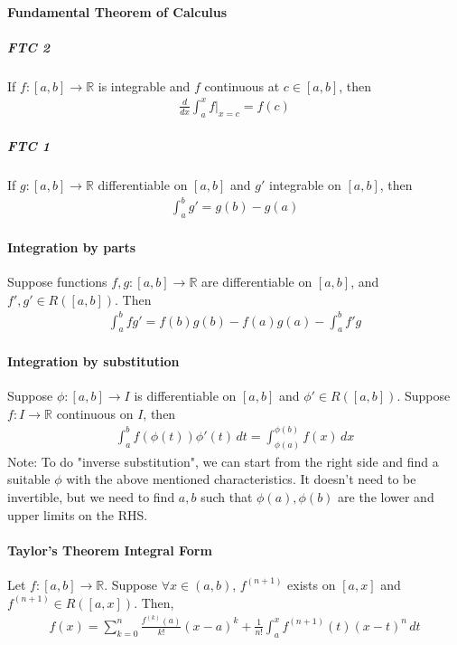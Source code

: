 \documentclass{article}
\begin{document}
\paragraph{Fundamental Theorem of Calculus}
\subparagraph{FTC 2}
If $f: [a,b]\rightarrow \mathbb{R}$ is integrable and $f$ continuous at $c\in [a,b]$, then
\begin{align*}
	\frac{d}{dx}\int_a^xf |_{x=c} = f(c)
\end{align*}

\subparagraph{FTC 1}
If $g: [a,b]\rightarrow \mathbb{R}$ differentiable on $[a,b]$ and $g'$ integrable on $[a,b]$, then
\begin{align*}
	\int_a^bg' = g(b)-g(a)
\end{align*}

\paragraph{Integration by parts}
Suppose functions $f,g:[a,b]\rightarrow \mathbb{R}$ are differentiable on $[a,b]$, and $f',g'\in R([a,b])$. Then
\begin{align*}
	\int_a^b fg' = f(b)g(b)-f(a)g(a)-\int_a^b f'g
\end{align*}


\paragraph{Integration by substitution}
Suppose $\phi: [a,b]\rightarrow I$ is differentiable on $[a,b]$ and $\phi'\in R([a,b])$. Suppose $f: I\rightarrow \mathbb{R}$ continuous on $I$, then
\begin{align*}
	\int_a^b f(\phi(t))\phi'(t)\,dt = \int_{\phi(a)}^{\phi(b)}f(x)\,dx
\end{align*}
Note: To do "inverse substitution", we can start from the right side and find a suitable $\phi$ with the above mentioned characteristics. It doesn't need to be invertible, but we need to find $a,b$ such that $\phi(a), \phi(b)$ are the lower and upper limits on the RHS.

\paragraph{Taylor's Theorem Integral Form}
Let $f:[a,b]\rightarrow \mathbb{R}$. Suppose $\forall x\in (a,b)$, $f^(n+1)$ exists on $[a,x]$ and $f^{(n+1)}\in R([a,x])$. Then,
\begin{align*}
	f(x) = \sum_{k=0}^n\frac{f^{(k)}(a)}{k!}(x-a)^k + \frac{1}{n!}\int_a^xf^{(n+1)}(t)(x-t)^n\,dt
\end{align*}
\end{document}
